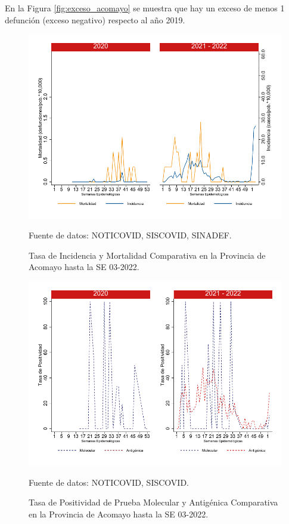 \documentclass[12pt,a4paper,openany]{book}
\begin{document}
		 En la Figura \ref{fig:exceso_acomayo} se muestra que hay un exceso de menos 1 defunción (exceso negativo) respecto al año 2019.
		
		\begin{figure}[h]
			\caption{Tasa de Incidencia y Mortalidad Comparativa en la Provincia de Acomayo hasta la SE 03-2022.}\label{fig:inc_mort_acomayo}
			\begin{center}
				\includegraphics[width=0.65\linewidth]{../figuras/incidencia_mortalidad_20_21_1}
			\end{center}
			{\footnotesize {Fuente de datos: NOTICOVID, SISCOVID, SINADEF.}}
		\end{figure}
		
		\begin{figure}[h]
			\caption{Tasa de Positividad de Prueba Molecular y Antigénica Comparativa en la Provincia de Acomayo hasta la SE 03-2022. }\label{fig:positividad_acomayo}
			\begin{center}
				\includegraphics[width=0.7\linewidth]{../figuras/positividad_20_21_1}
			\end{center}
			{\footnotesize {Fuente de datos: NOTICOVID, SISCOVID.}}
		\end{figure}
		
\end{document}
